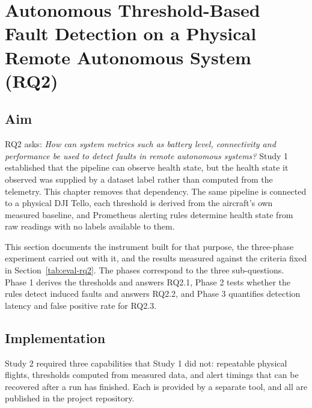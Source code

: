 %

\section{Autonomous Threshold-Based Fault Detection on a Physical Remote
Autonomous System (RQ2)}\label{sec:rq2}

\subsection{Aim}\label{sec:rq2-aim}

RQ2 asks: \emph{How can system metrics such as battery level, connectivity and
performance be used to detect faults in remote autonomous systems?} Study 1
established that the pipeline can observe health state, but the health state it
observed was supplied by a dataset label rather than computed from the
telemetry. This chapter removes that dependency. The same pipeline is connected
to a physical DJI Tello, each threshold is derived from the aircraft's own
measured baseline, and Prometheus alerting rules determine health state from raw
readings with no labels available to them.

This section documents the instrument built for that purpose, the three-phase
experiment carried out with it, and the results measured against the criteria
fixed in Section~\ref{tab:eval-rq2}. The phases correspond to the three
sub-questions. Phase 1 derives the thresholds and answers RQ2.1, Phase 2 tests
whether the rules detect induced faults and answers RQ2.2, and Phase 3
quantifies detection latency and false positive rate for RQ2.3.

\subsection{Implementation}\label{sec:rq2-impl}

Study 2 required three capabilities that Study 1 did not: repeatable physical
flights, thresholds computed from measured data, and alert timings that can be
recovered after a run has finished. Each is provided by a separate tool, and all
are published in the project repository.

